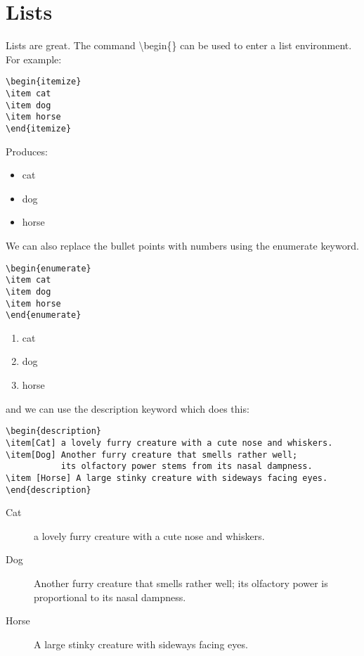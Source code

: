 \chapter{Lists}
Lists are great.  The command {\textbackslash}begin\{\} can be used to enter a list environment.  For example:

\begin{verbatim}
\begin{itemize}
\item cat
\item dog
\item horse
\end{itemize}
\end{verbatim}

Produces:

\begin{itemize}
\item cat
\item dog
\item horse
\end{itemize}

\pagebreak
We can also replace the bullet points with numbers using the enumerate keyword.

\begin{verbatim}
\begin{enumerate}
\item cat
\item dog
\item horse
\end{enumerate}
\end{verbatim}

\begin{enumerate}
\item cat
\item dog
\item horse
\end{enumerate}

\pagebreak
and we can use the description keyword which does this:
\begin{verbatim}
\begin{description}
\item[Cat] a lovely furry creature with a cute nose and whiskers.
\item[Dog] Another furry creature that smells rather well; 
           its olfactory power stems from its nasal dampness.
\item [Horse] A large stinky creature with sideways facing eyes.
\end{description}
\end{verbatim}

\begin{description}
\item[Cat] a lovely furry creature with a cute nose and whiskers.
\item[Dog] Another furry creature that smells rather well; its olfactory power is proportional to its nasal dampness.
\item [Horse] A large stinky creature with sideways facing eyes.
\end{description}